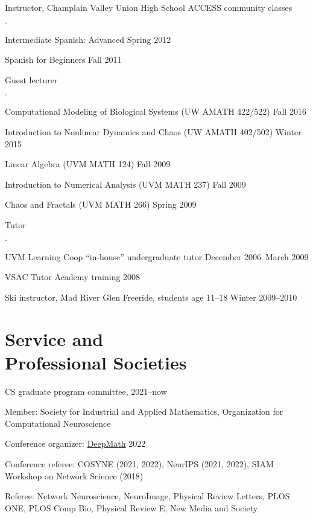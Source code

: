 \documentclass[margin,line]{res}
\newenvironment{list1}{
  \begin{list}{$\cdot$}{%
      \setlength{\itemsep}{0in}
      \setlength{\parsep}{0in} \setlength{\parskip}{0in}
      \setlength{\topsep}{0in} \setlength{\partopsep}{0in} 
      \setlength{\leftmargin}{0.17in}}}{\end{list}}
\begin{document}
\begin{resume}
  Instructor, Champlain Valley Union High School ACCESS community classes
  \begin{list1}
  \item Intermediate Spanish: Advanced
    \hfill Spring 2012
  \item Spanish for Beginners
    \hfill Fall 2011
  \end{list1}

  Guest lecturer
  \begin{list1}
  \item Computational Modeling of Biological Systems (UW AMATH 422/522)
    \hfill Fall 2016
  \item Introduction to Nonlinear Dynamics and Chaos (UW AMATH 402/502)
    \hfill Winter 2015
  \item Linear Algebra (UVM MATH 124) \hfill Fall 2009
  \item Introduction to Numerical Analysis (UVM MATH 237) \hfill  Fall 2009
  \item Chaos and Fractals (UVM MATH 266) \hfill Spring 2009
  \end{list1}

  Tutor
  \begin{list1}
  \item UVM Learning Coop ``in-house'' undergraduate tutor 
    \hfill December 2006--March 2009
  \item VSAC Tutor Academy training \hfill 2008
  \end{list1}

  Ski instructor, Mad River Glen Freeride, students age 11--18 \hfill
  Winter 2009--2010

  \section{\sc Service and\\Professional Societies}

  CS graduate program committee, 2021--now

  Member: Society for Industrial and Applied Mathematics,
  Organization for Computational Neuroscience

  Conference organizer: \href{https://deepmath-conference.com/}{DeepMath} 2022
  
  Conference referee:
  COSYNE (2021, 2022),
  NeurIPS (2021, 2022),
  SIAM Workshop on Network Science (2018)
  
  Referee:
  Network Neuroscience,
  NeuroImage,
  Physical Review Letters, PLOS ONE, PLOS Comp Bio,
  Physical Review E, New Media and Society


\end{resume}
\end{document}
